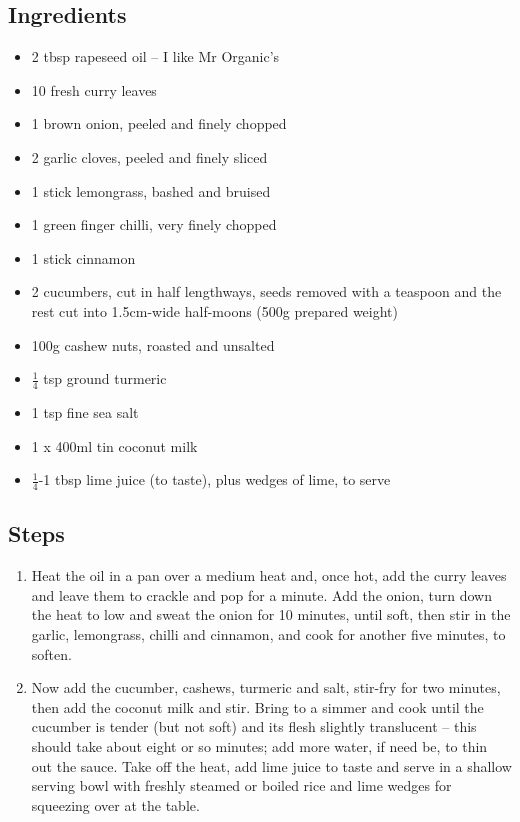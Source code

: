 \documentclass{book}
\begin{document}
\subsection*{Ingredients}
\begin{itemize}
\item 2 tbsp rapeseed oil – I like Mr Organic’s 
\item 10 fresh curry leaves
\item 1 brown onion, peeled and finely chopped
\item 2 garlic cloves, peeled and finely sliced
\item 1 stick lemongrass, bashed and bruised
\item 1 green finger chilli, very finely chopped 
\item 1 stick cinnamon
\item 2 cucumbers, cut in half lengthways, seeds removed with a teaspoon and the rest cut into 1.5cm-wide half-moons (500g prepared weight)
\item 100g cashew nuts, roasted and unsalted
\item $\frac{1}{4}$ tsp ground turmeric
\item 1 tsp fine sea salt
\item 1 x 400ml tin coconut milk 
\item $\frac{1}{4}$-1 tbsp lime juice (to taste), plus wedges of lime, to serve
\end{itemize}

\subsection*{Steps}
\begin{enumerate}
\item Heat the oil in a pan over a medium heat and, once hot, add the curry leaves and leave them to crackle and pop for a minute. Add the onion, turn down the heat to low and sweat the onion for 10 minutes, until soft, then stir in the garlic, lemongrass, chilli and cinnamon, and cook for another five minutes, to soften.
\item Now add the cucumber, cashews, turmeric and salt, stir-fry for two minutes, then add the coconut milk and stir. Bring to a simmer and cook until the cucumber is tender (but not soft) and its flesh slightly translucent – this should take about eight or so minutes; add more water, if need be, to thin out the sauce. Take off the heat, add lime juice to taste and serve in a shallow serving bowl with freshly steamed or boiled rice and lime wedges for squeezing over at the table. 
\end{enumerate}
\newpage
\end{document}
